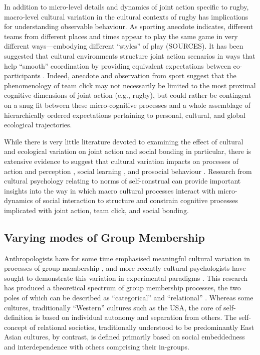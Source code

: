 {  In addition to micro-level details and dynamics of joint action specific to rugby, macro-level cultural variation in the cultural contexts of rugby has implications for understanding observable behaviour.  As sporting anecdote indicates, different teams from different places and times appear to play the same game in very different ways---embodying different ``styles'' of play (SOURCES).  It has been suggested that cultural environments structure joint action scenarios in ways that help ``smooth'' coordination by providing equivalent expectations between co-participants \citep{Vesper2017}.  Indeed, anecdote and observation from sport suggest that the phenomenology of team click may not necessarily be limited to the most proximal cognitive dimensions of joint action (e.g., rugby), but could rather be contingent on a snug fit between these micro-cognitive processes and a whole assemblage of hierarchically ordered expectations pertaining to personal, cultural, and global ecological trajectories.

  While there is very little literature devoted to examining the effect of cultural and ecological variation on joint action and social bonding in particular, there is extensive evidence to suggest that cultural variation impacts on processes of action and perception \citep{Nisbett2003,Hoshino-Browne2005}, social learning \citep{Mesoudi2015}, and prosocial behaviour \citep{Yuki2005,Yuki2003}.  Research from cultural psychology relating to norms of self-construal can provide important insights into the way in which macro cultural processes interact with micro-dynamics of social interaction to structure and constrain cognitive processes implicated with joint action, team click, and social bonding.

  \subsection{Varying modes of Group Membership}

  Anthropologists have for some time emphasised meaningful cultural variation in   processes of group membership \citep{Strodtbeck1961,Kluckhohn1961,Mead1967,Fei1992}, and more recently cultural psychologists have sought to demonstrate this variation in experimental paradigms \citep{Markus1991,Nisbett2001}.  This research has produced a theoretical spectrum of group membership processes, the two poles of which can be described as ``categorical'' and ``relational'' \citep{Hofstede1980,Brewer2007}.  Whereas some cultures, traditionally ``Western'' cultures such as the USA, the core of self-definition is based on individual autonomy and separation from others.
  The self-concept of relational societies, traditionally understood to be predominantly East Asian cultures, by contrast, is defined primarily based on social embeddedness and interdependence with others comprising their in-groups\citep{Leung2012}.

}
